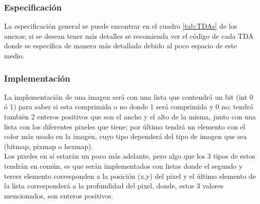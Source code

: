   \subsubsection{Especificación}
    La especificación general se puede encontrar en el cuadro \ref{tab:TDAs} de los anexos;
    si se desean tener más detalles se recomienda ver el código de cada TDA donde se específica
    de manera más detallada debido al poco espacio de este medio.

  \subsubsection{Implementación}
    La implementación de una imagen será con una lista que contendrá un bit (int 0 ó 1) para saber si esta comprimida o no
    donde 1 será comprimida y 0 no; tendrá también 2 enteros positivos que son el ancho y el alto de la misma, junto
    con una lista con los diferentes pixeles que tiene; por último tendrá un elemento con el color más
    usado en la imagen, cuyo tipo dependerá del tipo de imagen que sea (bitmap, pixmap o hexmap).\\

    Los pixeles en sí estarán un poco más adelante, pero algo que los 3 tipos de estos tendrán en común, es que serán implementados con listas 
    donde el segundo y tercer elemento corresponden a la posición (x,y) del pixel y el último elemento de la lista
    corresponderá a la profundidad del pixel, donde, estos 3 valores mencionados, son enteros positivos.\\

